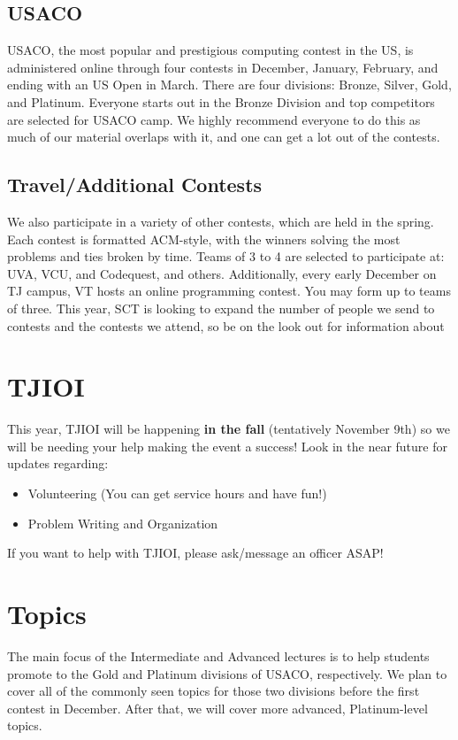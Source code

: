 \documentclass[11pt]{article}
\begin{document}
\subsection{USACO}
    USACO, the most popular and prestigious computing contest in the US, is administered online through four contests in December, January, February, and ending with an US Open in March. There are four divisions: Bronze, Silver, Gold, and Platinum. Everyone starts out in the Bronze Division and top competitors are selected for USACO camp. We highly recommend everyone to do this as much of our material overlaps with it, and one can get a lot out of the contests.       
\subsection{Travel/Additional Contests}
    We also participate in a variety of other contests, which are held in the spring. Each contest is formatted ACM-style, with the winners solving the most problems and ties broken by time. Teams of 3 to 4 are selected to participate at: UVA, VCU, and Codequest, and others. Additionally, every early December on TJ campus, VT hosts an online programming contest. You may form up to teams of three. This year, SCT is looking to expand the number of people we send to contests and the contests we attend, so be on the look out for information about  
\section{TJIOI}
    This year, TJIOI will be happening \textbf{in the fall} (tentatively November 9th) so we will be needing your help making the event a success! Look in the near future for updates regarding:
    \begin{itemize}
        \item Volunteering (You can get service hours and have fun!)
        \item Problem Writing and Organization
    \end{itemize}
    If you want to help with TJIOI, please ask/message an officer ASAP!
\section{Topics}
    The main focus of the Intermediate and Advanced lectures is to help students promote to the Gold and Platinum divisions of USACO, respectively. We plan to cover all of the commonly seen topics for those two divisions before the first contest in December. After that, we will cover more advanced, Platinum-level topics.
    
\end{document}
